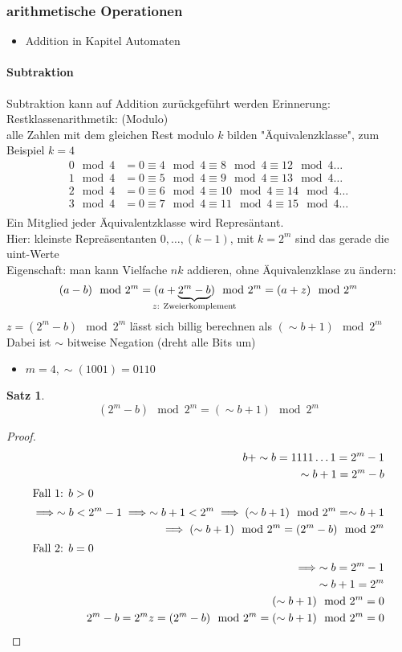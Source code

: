 \documentclass[a4paper]{scrartcl}
\theoremstyle{definition}
\theoremstyle{plain}
\newtheorem{thm}{Satz}
\theoremstyle{remark}
\theoremstyle{remark}
\begin{document}
\subsubsection{arithmetische Operationen}
\label{sec-16-1-2}
\begin{itemize}
\item Addition in Kapitel Automaten \\
\end{itemize}
\paragraph{Subtraktion}
\label{sec-16-1-2-1}
Subtraktion kann auf Addition zurückgeführt werden
Erinnerung: Restklassenarithmetik: (Modulo) \\
     alle Zahlen mit dem gleichen Rest modulo $k$ bilden "Äquivalenzklasse", zum Beispiel $k = 4$
\begin{align*}
0 \mod 4 &= 0 \equiv 4 \mod 4 \equiv 8 \mod 4 \equiv 12 \mod 4 \ldots \\
1 \mod 4 &= 0 \equiv 5 \mod 4 \equiv 9 \mod 4 \equiv 13 \mod 4 \ldots \\
2 \mod 4 &= 0 \equiv 6 \mod 4 \equiv 10 \mod 4 \equiv 14 \mod 4 \ldots \\
3 \mod 4 &= 0 \equiv 7 \mod 4 \equiv 11 \mod 4 \equiv 15 \mod 4 \ldots \\
\end{align*}
Ein Mitglied jeder Äquivalentzklasse wird Represäntant. \\
     Hier: kleinste Repreäsentanten $0, \ldots, (k - 1)$, mit $k = 2^m$
sind das gerade die uint-Werte \\
     Eigenschaft: man kann Vielfache $n k$ addieren, ohne Äquivalenzklase zu ändern: \\
     \[ (a - b) \mod 2^m = (a + \underbrace{2^m - b}_{\mathclap{z:~\text{Zweierkomplement}}}) \mod 2^m = (a + z) \mod 2^m \]
$z = (2^m - b) \mod 2^m$ lässt sich billig berechnen als $(\sim b + 1) \mod 2^m$
Dabei ist $\sim$ bitweise Negation (dreht alle Bits um)
\begin{itemize}
\item $m = 4, \sim(1001) = 0110$
\end{itemize}
\begin{thm}
\[(2^m - b) \mod 2^m = (\sim b + 1) \mod 2^m\]
\end{thm}
\begin{proof}
\begin{align*}
b + \sim b = 1111\ldots 1 = 2^m - 1 \\
\sim b + 1 = 2^{m} - b \\
\intertext{Fall 1: $b > 0$}
\implies \sim b < 2^m - 1 \implies \sim b + 1 < 2^m \implies (\sim b + 1) \mod 2^m = \sim b + 1 \\
\implies (\sim b + 1) \mod 2^m = (2^m - b) \mod 2^m \\
\intertext{Fall 2: $b = 0$}
\implies \sim b = 2^m - 1 \\
\sim b + 1 = 2^m \\
(\sim b + 1) \mod 2^m = 0 \\
2^m - b = 2^m
z = (2^m - b) \mod 2^m = (\sim b + 1) \mod 2^m = 0
\end{align*}
\end{proof}
\end{document}
